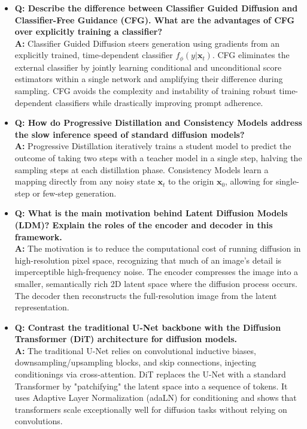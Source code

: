 \begin{itemize}
    \item \textbf{Q: Describe the difference between Classifier Guided Diffusion and Classifier-Free Guidance (CFG). What are the advantages of CFG over explicitly training a classifier?} \\
    \textbf{A:} Classifier Guided Diffusion steers generation using gradients from an explicitly trained, time-dependent classifier $f_\phi(y|\mathbf{x}_t)$. CFG eliminates the external classifier by jointly learning conditional and unconditional score estimators within a single network and amplifying their difference during sampling. CFG avoids the complexity and instability of training robust time-dependent classifiers while drastically improving prompt adherence.
    \item \textbf{Q: How do Progressive Distillation and Consistency Models address the slow inference speed of standard diffusion models?} \\
    \textbf{A:} Progressive Distillation iteratively trains a student model to predict the outcome of taking two steps with a teacher model in a single step, halving the sampling steps at each distillation phase. Consistency Models learn a mapping directly from any noisy state $\mathbf{x}_t$ to the origin $\mathbf{x}_0$, allowing for single-step or few-step generation.
    \item \textbf{Q: What is the main motivation behind Latent Diffusion Models (LDM)? Explain the roles of the encoder and decoder in this framework.} \\
    \textbf{A:} The motivation is to reduce the computational cost of running diffusion in high-resolution pixel space, recognizing that much of an image's detail is imperceptible high-frequency noise. The encoder compresses the image into a smaller, semantically rich 2D latent space where the diffusion process occurs. The decoder then reconstructs the full-resolution image from the latent representation.
    \item \textbf{Q: Contrast the traditional U-Net backbone with the Diffusion Transformer (DiT) architecture for diffusion models.} \\
    \textbf{A:} The traditional U-Net relies on convolutional inductive biases, downsampling/upsampling blocks, and skip connections, injecting conditionings via cross-attention. DiT replaces the U-Net with a standard Transformer by "patchifying" the latent space into a sequence of tokens. It uses Adaptive Layer Normalization (adaLN) for conditioning and shows that transformers scale exceptionally well for diffusion tasks without relying on convolutions.
\end{itemize}
